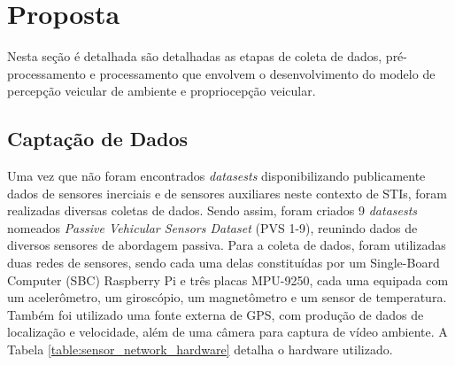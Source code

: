 \chapter{Proposta}
\label{cap:proposta}

Nesta seção é detalhada são detalhadas as etapas de coleta de dados, pré-processamento e processamento que envolvem o desenvolvimento do modelo de percepção veicular de ambiente e propriocepção veicular.

\section{Captação de Dados}

Uma vez que não foram encontrados \textit{datasests} disponibilizando publicamente dados de sensores inerciais e de sensores auxiliares neste contexto de STIs, foram realizadas diversas coletas de dados. Sendo assim, foram criados 9  \textit{datasests} nomeados \textit{Passive Vehicular Sensors Dataset} (PVS 1-9), reunindo dados de diversos sensores de abordagem passiva. Para a coleta de dados, foram utilizadas duas redes de sensores, sendo cada uma delas constituídas por um Single-Board Computer (SBC) Raspberry Pi e três placas MPU-9250, cada uma equipada com um acelerômetro, um giroscópio, um magnetômetro e um sensor de temperatura. Também foi utilizado uma fonte externa de GPS, com produção de dados de localização e velocidade, além de uma câmera para captura de vídeo ambiente. A Tabela \ref{table:sensor_network_hardware} detalha o hardware utilizado.

